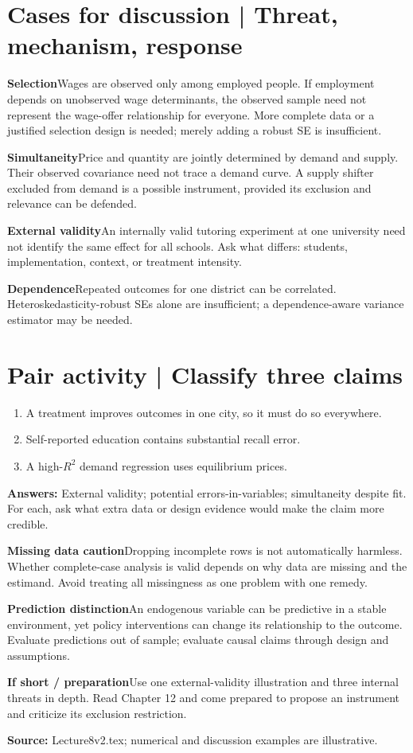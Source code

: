 \documentclass[11pt,a4paper]{article}
\newcommand{\heading}[1]{\section*{\color{accent}#1}}
\newcommand{\cue}[2]{\par\noindent\textbf{#1}\quad #2\par}
\begin{document}
\newpage
\heading{Cases for discussion | Threat, mechanism, response}
\cue{Selection}{Wages are observed only among employed people. If employment depends on unobserved wage determinants, the observed sample need not represent the wage-offer relationship for everyone. More complete data or a justified selection design is needed; merely adding a robust SE is insufficient.}
\cue{Simultaneity}{Price and quantity are jointly determined by demand and supply. Their observed covariance need not trace a demand curve. A supply shifter excluded from demand is a possible instrument, provided its exclusion and relevance can be defended.}
\cue{External validity}{An internally valid tutoring experiment at one university need not identify the same effect for all schools. Ask what differs: students, implementation, context, or treatment intensity.}
\cue{Dependence}{Repeated outcomes for one district can be correlated. Heteroskedasticity-robust SEs alone are insufficient; a dependence-aware variance estimator may be needed.}
\heading{Pair activity | Classify three claims}
\begin{enumerate}
\item A treatment improves outcomes in one city, so it must do so everywhere.
\item Self-reported education contains substantial recall error.
\item A high-$R^2$ demand regression uses equilibrium prices.
\end{enumerate}
\textbf{Answers:} External validity; potential errors-in-variables; simultaneity despite fit. For each, ask what extra data or design evidence would make the claim more credible.
\cue{Missing data caution}{Dropping incomplete rows is not automatically harmless. Whether complete-case analysis is valid depends on why data are missing and the estimand. Avoid treating all missingness as one problem with one remedy.}
\cue{Prediction distinction}{An endogenous variable can be predictive in a stable environment, yet policy interventions can change its relationship to the outcome. Evaluate predictions out of sample; evaluate causal claims through design and assumptions.}
\cue{If short / preparation}{Use one external-validity illustration and three internal threats in depth. Read Chapter 12 and come prepared to propose an instrument and criticize its exclusion restriction.}
\textbf{Source:} Lecture8v2.tex; numerical and discussion examples are illustrative.
\end{document}
